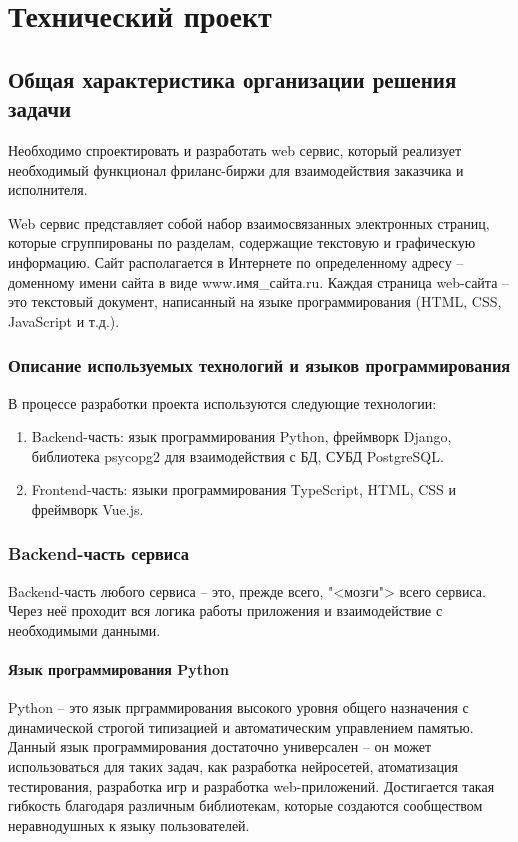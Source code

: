 \section{Технический проект}
\subsection{Общая характеристика организации решения задачи}

Необходимо спроектировать и разработать web сервис, который реализует необходимый функционал фриланс-биржи для взаимодействия заказчика и исполнителя.

Web сервис представляет собой набор взаимосвязанных электронных страниц, которые сгруппированы по разделам, содержащие текстовую и графическую информацию. Сайт располагается в Интернете по определенному адресу – доменному имени сайта в виде www.имя\_сайта.ru. Каждая страница web-сайта – это текстовый документ, написанный на языке программирования (HTML, CSS, JavaScript и т.д.).

\subsubsection{Описание используемых технологий и языков программирования}

В процессе разработки проекта используются следующие технологии:

\begin{enumerate}
	\item Backend-часть: язык программирования Python, фреймворк Django, библиотека psycopg2 для взаимодействия с БД, СУБД PostgreSQL.
	\item Frontend-часть: языки программирования TypeScript, HTML, CSS и фреймворк Vue.js.
\end{enumerate}

\subsubsection{Backend-часть сервиса}

Backend-часть любого сервиса -- это, прежде всего, "<мозги"> всего сервиса. Через неё проходит вся логика работы приложения и взаимодействие с необходимыми данными. 

\paragraph{Язык программирования Python}

Python -- это язык прграммирования высокого уровня общего назначения с динамической строгой типизацией и автоматическим управлением памятью. Данный язык программирования достаточно универсален -- он может использоваться для таких задач, как разработка нейросетей, атоматизация тестирования, разработка игр и разработка web-приложений. Достигается такая гибкость благодаря различным библиотекам, которые создаются сообществом неравнодушных к языку пользователей.

